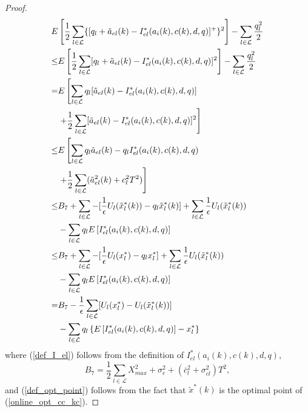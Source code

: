 \documentclass[conference]{IEEEtran}
\begin{document}
\begin{proof}
\begin{align}
 	E & \left[ \frac{1}{2} \sum_{l \in \mathcal{L}} \{ [ q_l + \tilde{a}_{el}(k) - I_{el}^*(a_i(k),c(k),d,q) ]^+ \}^2 \right] - \sum_{l \in \mathcal{L}} \frac{q_l^2}{2} \notag \\
	\leq & E \left[ \frac{1}{2} \sum_{l \in \mathcal{L}} [ q_l + \tilde{a}_{el}(k) - I_{el}^*(a_i(k),c(k),d,q) ]^2 \right] - \sum_{l \in \mathcal{L}} \frac{q_l^2}{2} \notag \\
 	= & E \left[ \sum_{l \in \mathcal{L}} q_l [ \tilde{a}_{el}(k) - I_{el}^*(a_i(k),c(k),d,q) ] \right. \notag \\
 	& \left. + \frac{1}{2} \sum_{l \in \mathcal{L}} [ \tilde{a}_{el}(k) - I_{el}^*(a_i(k),c(k),d,q) ]^2 \right] \notag \\
 	\leq & E \left[ \sum_{l \in \mathcal{L}} q_l \tilde{a}_{el}(k) - q_l I_{el}^*(a_i(k),c(k),d,q) \right. \notag \\
 	& \left. + \frac{1}{2} \sum_{l \in \mathcal{L}} ( \tilde{a}_{el}^2(k) + c_l^2 T^2 ) \right] \label{def_I_el} \\
 	\leq & B_7 + \sum_{l \in \mathcal{L}} - [ \frac{1}{\epsilon}U_l(\tilde{x}_l^*(k)) - q_l \tilde{x}_l^*(k) ] + \sum_{l \in \mathcal{L}} \frac{1}{\epsilon}U_l(\tilde{x}_l^*(k)) \notag \\
 	& - \sum_{l \in \mathcal{L}} q_l E \left[ I_{el}^*(a_i(k),c(k),d,q) \right] \notag \\
 	\leq & B_7 + \sum_{l \in \mathcal{L}} - [ \frac{1}{\epsilon}U_l(x_l^*) - q_l x_l^* ] + \sum_{l \in \mathcal{L}} \frac{1}{\epsilon}U_l(\tilde{x}_l^*(k)) \label{def_opt_point} \\
 	& - \sum_{l \in \mathcal{L}} q_l E \left[ I_{el}^*(a_i(k),c(k),d,q) \right] \notag \\
 	= & B_7 - \frac{1}{\epsilon} \sum_{l \in \mathcal{L}} [ U_l(x_l^*) - U_l(\tilde{x}_l^*(k)) ] \notag \\
 	& - \sum_{l \in \mathcal{L}} q_l \left\{ E \left[ I_{el}^*(a_i(k),c(k),d,q) \right] - x_l^* \right\} \notag
\end{align}
where (\ref{def_I_el}) follows from the definition of $I_{el}^*(a_i(k),c(k),d,q)$,
\begin{equation*}
	B_7 = \frac{1}{2} \sum_{l \in \mathcal{L}} X_{max}^2 + \sigma_{e}^2 + ( \bar{c}_l^2 + \sigma_{cl}^2 ) T^2,
\end{equation*}
and (\ref{def_opt_point}) follows from the fact that $\tilde{x}^*(k)$ is the optimal point of (\ref{online_opt_cc_kc}).
\end{proof}
\end{document}
